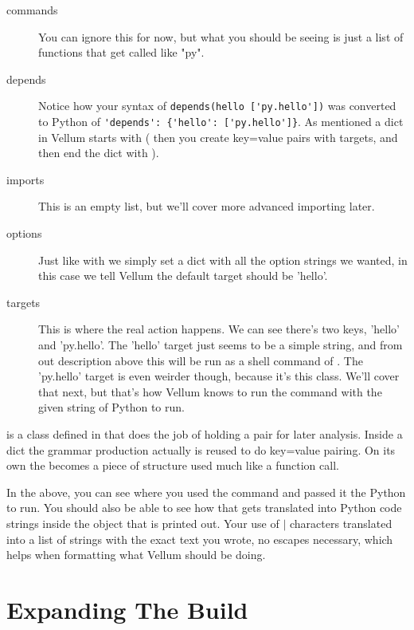 \begin{description}

\item[commands] You can ignore this for now, but what you should be seeing is
    just a list of functions that get called like "py".
\item[depends] Notice how your syntax of \verb|depends(hello ['py.hello'])| was
    converted to Python of \verb|'depends': {'hello': ['py.hello']}|.  As mentioned
    a dict in Vellum starts with ( then you create key=value pairs with targets, and
    then end the dict with ).
\item[imports] This is an empty list, but we'll cover more advanced importing
    later.
\item[options] Just like with  we simply set a dict with all the
    option strings we wanted, in this case we tell Vellum the default target should
    be 'hello'.
\item[targets] This is where the real action happens.  We can see there's two
    keys, 'hello' and 'py.hello'.  The 'hello' target just seems to be a simple
    string, and from out description above this will be run as a shell command of
    .  The 'py.hello' target is even weirder though, because it's
    this  class.  We'll cover that next, but that's how Vellum
    knows to run the command  with the given string of Python to run.

\end{description}

 is a class defined in  that does
the job of holding a  pair for later analysis.  Inside a
dict the  grammar production actually is reused to do key=value
pairing.  On its own the  becomes a piece of structure used much
like a function call.

In the above, you can see where you used the  command and passed it
the Python to run.  You should also be able to see how that gets translated into
Python code strings inside the  object that is printed out.
Your use of $|$ characters translated into a list of strings with the exact text
you wrote, no escapes necessary, which helps when formatting what Vellum should
be doing.


\section{Expanding The Build}





